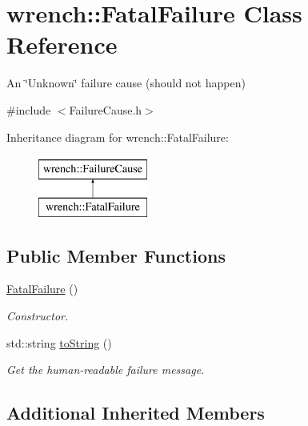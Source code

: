 \hypertarget{classwrench_1_1_fatal_failure}{}\section{wrench\+:\+:Fatal\+Failure Class Reference}
\label{classwrench_1_1_fatal_failure}


An \char`\"{}\+Unknown\char`\"{} failure cause (should not happen)  




{\ttfamily \#include $<$Failure\+Cause.\+h$>$}

Inheritance diagram for wrench\+:\+:Fatal\+Failure\+:\begin{figure}[H]
\begin{center}
\leavevmode
\includegraphics[height=2.000000cm]{classwrench_1_1_fatal_failure}
\end{center}
\end{figure}
\subsection*{Public Member Functions}
\begin{DoxyCompactItemize}
\item 
\mbox{\label{classwrench_1_1_fatal_failure_af926761acc0458ebbb315d23f83e0d50}} 
\hyperlink{classwrench_1_1_fatal_failure_af926761acc0458ebbb315d23f83e0d50}{Fatal\+Failure} ()
\begin{DoxyCompactList}\small\item\em Constructor. \end{DoxyCompactList}\item 
std\+::string \hyperlink{classwrench_1_1_fatal_failure_a4b547da3bac56b7b23aeba34c2dbbd39}{to\+String} ()
\begin{DoxyCompactList}\small\item\em Get the human-\/readable failure message. \end{DoxyCompactList}\end{DoxyCompactItemize}
\subsection*{Additional Inherited Members}


